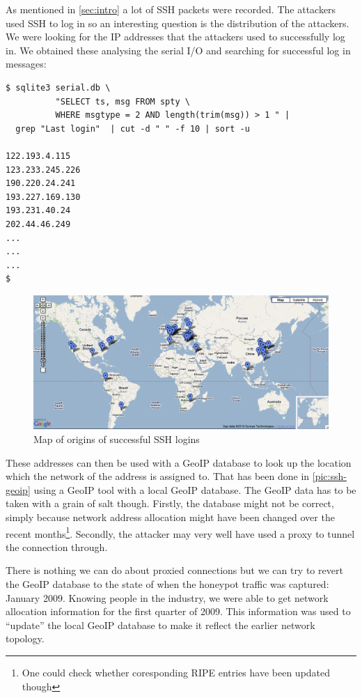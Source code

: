\documentclass[a4paper,
    11pt,
    normalheadings,
    parindent,
    UKenglish,
    abstracton,
    ]{scrartcl}
\begin{document}
As mentioned in \autoref{sec:intro} a lot of SSH packets were recorded.
The attackers used SSH to log in so an interesting question is the distribution of the attackers.
We were looking for the IP addresses that the attackers used to successfully log in.
We obtained these analysing the serial I/O and searching for successful log in messages:
\begin{verbatim}
$ sqlite3 serial.db \
          "SELECT ts, msg FROM spty \
          WHERE msgtype = 2 AND length(trim(msg)) > 1 " |
  grep "Last login"  | cut -d " " -f 10 | sort -u

122.193.4.115
123.233.245.226
190.220.24.241
193.227.169.130
193.231.40.24
202.44.46.249
...
...
...
$
\end{verbatim}
\begin{figure}
    \begin{center}\includegraphics[width=\textwidth]{bin/ssh-geoip.png}\end{center}
    \caption{Map of origins of successful SSH logins}
    \label{pic:ssh-geoip}
\end{figure}
These addresses can then be used with a GeoIP database to look up the location which the network of the address is assigned to.
That has been done in \autoref{pic:ssh-geoip} using a GeoIP tool with a local GeoIP database.
The GeoIP data has to be taken with a grain of salt though.
Firstly, the database might not be correct, simply because network address allocation might have been changed over the recent months\footnote{One could check whether coresponding RIPE entries have been updated though}.
Secondly, the attacker may very well have used a proxy to tunnel the connection through.

There is nothing we can do about proxied connections but we can try to revert the GeoIP database to the state of when the honeypot traffic was captured: January 2009.
Knowing people in the industry, we were able to get network allocation information for the first quarter of 2009.
This information was used to ``update'' the local GeoIP database to make it reflect the earlier network topology.
\end{document}

